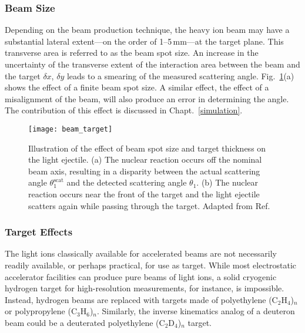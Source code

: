 \subsubsection{Beam Size}
Depending on the beam production technique, the heavy ion beam may have a substantial lateral extent---on the order of 1--5\,mm---at the target plane.  This transverse area is referred to as the beam spot size.  An increase in the uncertainty of the transverse extent of the interaction area between the beam and the target $\delta x$, $\delta y$ leads to a smearing of the measured scattering angle.  Fig.~\ref{beam_spot}(a) shows the effect of a finite beam spot size.  A similar effect, the effect of a misalignment of the beam, will also produce an error in determining the angle.  The contribution of this effect is discussed in Chapt.~\ref{simulation}.

\begin{figure}[t]%
\texttt{[image: beam\_target]}%
\caption[Illustration of the effect of beam spot size and target thickness on the light ejectile]{Illustration of the effect of beam spot size and target thickness on the light ejectile.  (a) The nuclear reaction occurs off the nominal beam axis, resulting in a disparity between the actual scattering angle $\theta_1^\textrm{scat}$ and the detected scattering angle $\theta_1$.  (b) The nuclear reaction occurs near the front of the target and the light ejectile scatters again while passing through the target.  Adapted from Ref.~\cite[Fig.~7]{Winfield_1997}}%
\label{beam_spot}%
\end{figure}

\subsubsection{Target Effects}
The light ions classically available for accelerated beams are not necessarily readily available, or perhaps practical, for use as target.  While most electrostatic accelerator facilities can produce pure beams of light ions, a solid cryogenic hydrogen target for high-resolution measurements, for instance, is impossible.  Instead, hydrogen beams are replaced with targets made of polyethylene (C$_2$H$_4$)$_{n}$ or polypropylene (C$_3$H$_6$)$_{n}$.  Similarly, the inverse kinematics analog of a deuteron beam could be a deuterated polyethylene (C$_2$D$_4$)$_{n}$ target.

